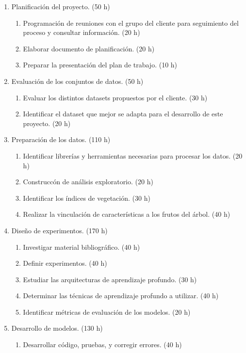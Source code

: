 \documentclass[
11pt, %
]{charter}
\begin{document}
\begin{enumerate}
\item Planificación del proyecto. (50 h)
	\begin{enumerate}
	\item Programación de reuniones con el grupo del cliente para seguimiento del proceso
  y consultar información.  (20 h)
  \item Elaborar documento de planificación. (20 h)
  \item Preparar la presentación del plan de trabajo. (10 h)
	\end{enumerate}
\item Evaluación de los conjuntos de datos. (50 h)
\begin{enumerate}
	\item Evaluar los distintos datasets propuestos por el cliente. (30 h)
  \item Identificar el dataset que mejor se adapta para el desarrollo de este proyecto. (20 h)
	\end{enumerate}
\item Preparación de los datos. (110 h)
	\begin{enumerate}
  \item Identificar librerías y herramientas necesarias para procesar los datos. (20 h)
	\item Construccón de análisis exploratorio. (20 h)
	\item Identificar los índices de vegetación. (30 h)
	\item Realizar la vinculación de características a los frutos del árbol. (40 h)
	\end{enumerate}
\item Diseño de experimentos. (170 h)
	\begin{enumerate}
	\item Investigar material bibliográfico. (40 h)
	\item Definir experimentos. (40 h)
	\item Estudiar las arquitecturas de aprendizaje profundo. (30 h)
	\item Determinar las técnicas de aprendizaje profundo a utilizar. (40 h)
	\item Identificar métricas de evaluación de los modelos. (20 h)
	\end{enumerate}
\item Desarrollo de modelos. (130 h)
	\begin{enumerate}
	\item Desarrollar código, pruebas, y corregir errores. (40 h)

\end{enumerate}
\end{enumerate}
\end{document}
